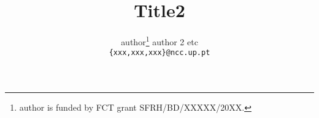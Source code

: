 \usepackage{techReps}


\makeatletter
\def\cleardoublepage{\clearpage\if@twoside \ifodd\c@page\else%
\hbox{}%
\thispagestyle{empty}
\newpage%
\if@twocolumn\hbox{}\newpage\fi\fi\fi}
\makeatother





\mkcoverpage

\title{Title2}
\author{author\thanks{author is funded by FCT grant
SFRH/BD/XXXXX/20XX.}\hspace{0.5cm} author 2 \hspace{0.5cm}
etc\\ {\tt \{xxx,xxx,xxx\}@ncc.up.pt}}

\date{}
\cleardoublepage

\maketitle


